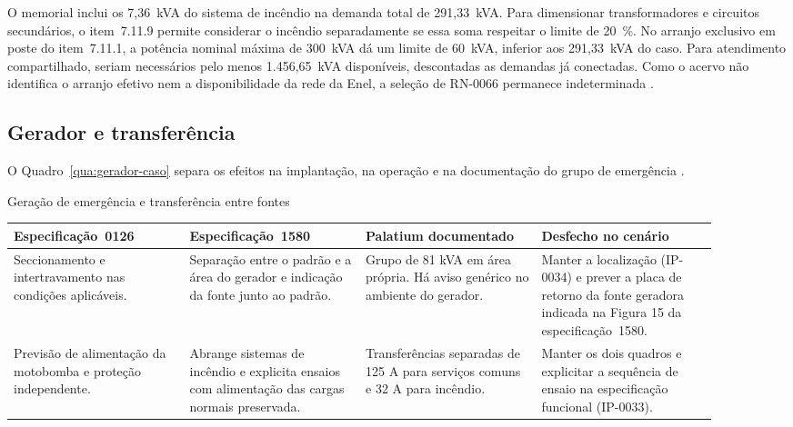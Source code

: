 O memorial inclui os 7,36~kVA do sistema de incêndio na demanda total de 291,33~kVA. Para dimensionar transformadores e circuitos secundários, o item~7.11.9 permite considerar o incêndio separadamente se essa soma respeitar o limite de 20~\%. No arranjo exclusivo em poste do item~7.11.1, a potência nominal máxima de 300~kVA dá um limite de 60~kVA, inferior aos 291,33~kVA do caso. Para atendimento compartilhado, seriam necessários pelo menos 1.456,65~kVA disponíveis, descontadas as demandas já conectadas. Como o acervo não identifica o arranjo efetivo nem a disponibilidade da rede da Enel, a seleção de RN-0066 permanece indeterminada \cite[p.~7]{palatiummemorial2025}\cite[item~7.11.9]{enel1580}.

\subsection{Gerador e transferência}\label{subsec:impacto-grupo-gerador}

O Quadro~\ref{qua:gerador-caso} separa os efeitos na implantação, na operação e na documentação do grupo de emergência \cite[itens~7.4 e~7.5.4]{enel0126}\cite[itens~7.11.8--7.11.9 e~7.11.13]{enel1580}.

\begin{quadro}[!htbp]
\centering
\caption{Geração de emergência e transferência entre fontes}\label{qua:gerador-caso}
{\small\setlength{\tabcolsep}{3pt}\renewcommand{\arraystretch}{1.14}
\begin{tabular}{|*{4}{>{\raggedright\arraybackslash}p{0.225\linewidth}|}}\hline
\textbf{Especificação~0126} & \textbf{Especificação~1580} & \textbf{Palatium documentado} & \textbf{Desfecho no cenário} \\\hline
Seccionamento e intertravamento nas condições aplicáveis. & Separação entre o padrão e a área do gerador e indicação da fonte junto ao padrão. & Grupo de 81 kVA em área própria. Há aviso genérico no ambiente do gerador. & Manter a localização (IP-0034) e prever a placa de retorno da fonte geradora indicada na Figura 15 da especificação~1580. \\\hline
Previsão de alimentação da motobomba e proteção independente. & Abrange sistemas de incêndio e explicita ensaios com alimentação das cargas normais preservada. & Transferências separadas de 125 A para serviços comuns e 32 A para incêndio. & Manter os dois quadros e explicitar a sequência de ensaio na especificação funcional (IP-0033). \\\hline
\end{tabular}}
\end{quadro}

